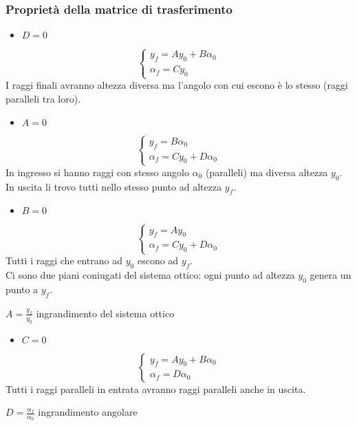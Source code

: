 \documentclass{article}
\begin{document}
\subsubsection*{Proprietà della matrice di trasferimento}
\begin{itemize}
\item $D = 0$
\end{itemize}
\[
\begin{cases}
y_f = Ay_0 + B\alpha_0\\
\alpha_f = Cy_0
\end{cases}
\]
I raggi finali avranno altezza diversa ma l'angolo con cui escono è lo stesso (raggi paralleli tra loro).
\begin{itemize}
\item $A = 0$
\end{itemize}
\[
\begin{cases}
y_f = B\alpha_0\\
\alpha_f = Cy_0 + D\alpha_0
\end{cases}
\]
In ingresso si hanno raggi con stesso angolo $\alpha_0$ (paralleli) ma diversa altezza $y_0$.\\
In uscita li trovo tutti nello stesso punto ad altezza $y_f$.
\begin{itemize}
\item $B = 0$
\end{itemize}
\[
\begin{cases}
y_f = Ay_0\\
\alpha_f = Cy_0 + D\alpha_0
\end{cases}
\]
Tutti i raggi che entrano ad $y_0$ escono ad $y_f$.\\
Ci sono due piani coniugati del sistema ottico: ogni punto ad altezza $y_0$ genera un punto a $y_f$.\\
\centerline{$A = \frac{y_f}{y_0}$ \qquad ingrandimento del sistema ottico}
\begin{itemize}
\item $C = 0$
\end{itemize}
\[
\begin{cases}
y_f = Ay_0 + B\alpha_0\\
\alpha_f = D\alpha_0
\end{cases}
\]
Tutti i raggi paralleli in entrata avranno raggi paralleli anche in uscita.\\
\centerline{$D = \frac{\alpha_f}{\alpha_0}$	\qquad ingrandimento angolare}
\end{document}
